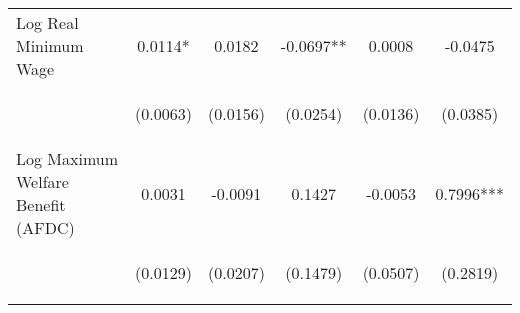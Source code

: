 \begin{center}
\begin{tabular}{lccccc}
\noalign{\smallskip}Log Real Minimum Wage & \begin{scriptsize}0.0114*\end{scriptsize} & \begin{scriptsize}0.0182\end{scriptsize} & \begin{scriptsize}-0.0697**\end{scriptsize} & \begin{scriptsize}0.0008\end{scriptsize} & \begin{scriptsize}-0.0475\end{scriptsize}\\
 & \begin{scriptsize}(0.0063)\end{scriptsize} & \begin{scriptsize}(0.0156)\end{scriptsize} & \begin{scriptsize}(0.0254)\end{scriptsize} & \begin{scriptsize}(0.0136)\end{scriptsize} & \begin{scriptsize}(0.0385)\end{scriptsize}\\
\noalign{\smallskip}Log Maximum Welfare Benefit (AFDC) & \begin{scriptsize}0.0031\end{scriptsize} & \begin{scriptsize}-0.0091\end{scriptsize} & \begin{scriptsize}0.1427\end{scriptsize} & \begin{scriptsize}-0.0053\end{scriptsize} & \begin{scriptsize}0.7996***\end{scriptsize}\\
 & \begin{scriptsize}(0.0129)\end{scriptsize} & \begin{scriptsize}(0.0207)\end{scriptsize} & \begin{scriptsize}(0.1479)\end{scriptsize} & \begin{scriptsize}(0.0507)\end{scriptsize} & \begin{scriptsize}(0.2819)\end{scriptsize}\\

\end{tabular}
\end{center}
